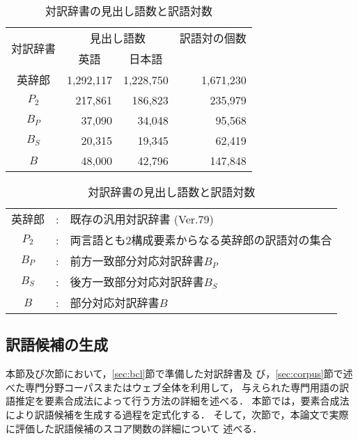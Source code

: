 \documentclass[japanese]{jnlp_1.3a}
\begin{document}
\begin{table}[t]
\small
 \centering
 \caption{対訳辞書の見出し語数と訳語対数}
 \label{tab:entry_number}
 \begin{tabular}{|c|r|r|r|}
  \hline
  \multirow{2}{*}{対訳辞書} & \multicolumn{2}{c|}{見出し語数} &
  訳語対の個数\\
  \hhline{|~|--|~|}
  & \multicolumn{1}{c|}{英語} & \multicolumn{1}{c|}{日本語} & \\
  \hline
  英辞郎 & 1,292,117 & 1,228,750 & 1,671,230 \\ 
  $P_2$  &   217,861 &   186,823 &   235,979 \\
  $B_P$  &    37,090 &    34,048 &    95,568 \\
  $B_S$  &    20,315 &    19,345 &    62,419 \\
  $B$    &    48,000 &    42,796 &   147,848 \\
  \hline
 \end{tabular}

\begin{tabular}{ccl}
 英辞郎 & : & 既存の汎用対訳辞書 (Ver.79)\\
 $P_2$  & : & 両言語とも2構成要素からなる英辞郎の訳語対の集合\\
 $B_P$  & : & 前方一致部分対応対訳辞書$B_P$\\
 $B_S$  & : & 後方一致部分対応対訳辞書$B_S$\\
 $B$    & : & 部分対応対訳辞書$B$
\end{tabular}
\end{table}

\subsection{訳語候補の生成}
\label{sec:generation}


本節及び次節において，\ref{sec:bcl}節で準備した対訳辞書及
び，\ref{sec:corpus}節で述べた専門分野コーパスまたはウェブ全体を利用して，
与えられた専門用語の訳語推定を要素合成法によって行う方法の詳細を述べる．
本節では，要素合成法により訳語候補を生成する過程を定式化する．
そして，次節で，本論文で実際に評価した訳語候補のスコア関数の詳細について
述べる．
\end{document}
